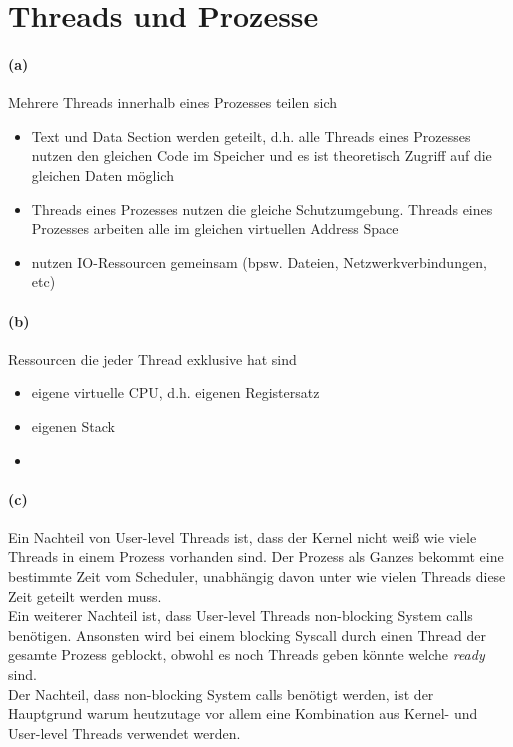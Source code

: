 \documentclass[a4paper]{article}
\begin{document}
\section{Threads und Prozesse}
\paragraph{(a)}
Mehrere Threads innerhalb eines Prozesses teilen sich
\begin{itemize}
    \item Text und Data Section werden geteilt, d.h. alle Threads eines Prozesses nutzen den gleichen Code im Speicher und es ist theoretisch Zugriff auf die gleichen Daten möglich
    \item Threads eines Prozesses nutzen die gleiche Schutzumgebung. Threads eines Prozesses arbeiten alle im gleichen virtuellen Address Space
    \item nutzen IO-Ressourcen gemeinsam (bpsw. Dateien, Netzwerkverbindungen, etc)
\end{itemize}

\paragraph{(b)}
Ressourcen die jeder Thread exklusive hat sind

\begin{itemize}
    \item eigene virtuelle CPU, d.h. eigenen Registersatz
    \item eigenen Stack
    \item {}
\end{itemize}

\paragraph{(c)}
Ein Nachteil von User-level Threads ist, dass der Kernel nicht weiß wie viele Threads in einem Prozess vorhanden sind. Der Prozess als Ganzes bekommt eine bestimmte Zeit vom Scheduler, unabhängig davon unter wie vielen Threads diese Zeit geteilt werden muss.\\
Ein weiterer Nachteil ist, dass User-level Threads non-blocking System calls benötigen. Ansonsten wird bei einem blocking Syscall durch einen Thread der gesamte Prozess geblockt, obwohl es noch Threads geben könnte welche \textit{ready} sind.\\
Der Nachteil, dass non-blocking System calls benötigt werden, ist der Hauptgrund warum heutzutage vor allem eine Kombination aus Kernel- und User-level Threads verwendet werden.
\end{document}
